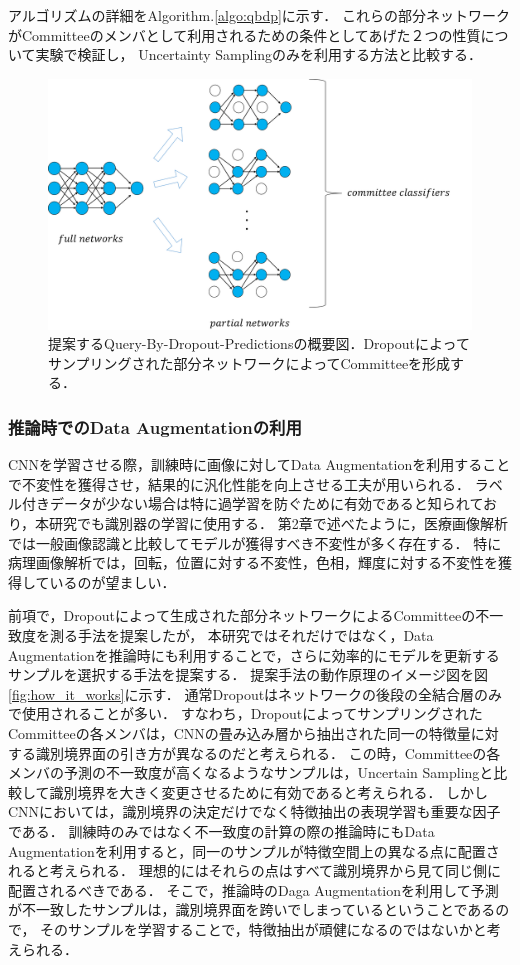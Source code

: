 アルゴリズムの詳細をAlgorithm.\ref{algo:qbdp}に示す．
これらの部分ネットワークがCommitteeのメンバとして利用されるための条件としてあげた２つの性質について実験で検証し，
Uncertainty Samplingのみを利用する方法と比較する．

\begin{figure}[tbp]
     \begin{center}
      \includegraphics[width=120mm]{figures/query_by_dropout.png}
     \end{center}
    \caption{\label{fig:query_by_dropout}提案するQuery-By-Dropout-Predictionsの概要図．Dropoutによってサンプリングされた部分ネットワークによってCommitteeを形成する．}
\end{figure}

\subsubsection{推論時での\textbf{Data Augmentation}の利用}
CNNを学習させる際，訓練時に画像に対してData Augmentationを利用することで不変性を獲得させ，結果的に汎化性能を向上させる工夫が用いられる．
ラベル付きデータが少ない場合は特に過学習を防ぐために有効であると知られており，本研究でも識別器の学習に使用する．
第2章で述べたように，医療画像解析では一般画像認識と比較してモデルが獲得すべき不変性が多く存在する．
特に病理画像解析では，回転，位置に対する不変性，色相，輝度に対する不変性を獲得しているのが望ましい．

前項で，Dropoutによって生成された部分ネットワークによるCommitteeの不一致度を測る手法を提案したが，
本研究ではそれだけではなく，Data Augmentationを推論時にも利用することで，さらに効率的にモデルを更新するサンプルを選択する手法を提案する．
提案手法の動作原理のイメージ図を図\ref{fig:how_it_works}に示す．
通常Dropoutはネットワークの後段の全結合層のみで使用されることが多い．
すなわち，DropoutによってサンプリングされたCommitteeの各メンバは，CNNの畳み込み層から抽出された同一の特徴量に対する識別境界面の引き方が異なるのだと考えられる．
この時，Committeeの各メンバの予測の不一致度が高くなるようなサンプルは，Uncertain Samplingと比較して識別境界を大きく変更させるために有効であると考えられる．
しかしCNNにおいては，識別境界の決定だけでなく特徴抽出の表現学習も重要な因子である．
訓練時のみではなく不一致度の計算の際の推論時にもData Augmentationを利用すると，同一のサンプルが特徴空間上の異なる点に配置されると考えられる．
理想的にはそれらの点はすべて識別境界から見て同じ側に配置されるべきである．
そこで，推論時のDaga Augmentationを利用して予測が不一致したサンプルは，識別境界面を跨いでしまっているということであるので，
そのサンプルを学習することで，特徴抽出が頑健になるのではないかと考えられる．

